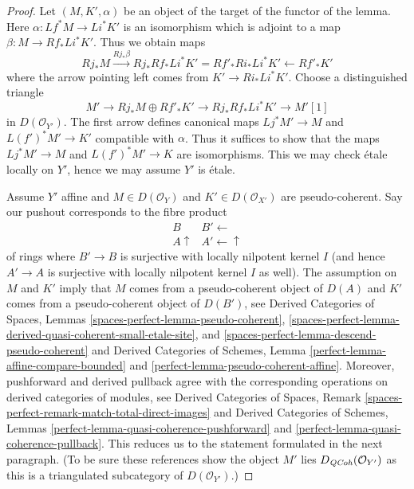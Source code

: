 \begin{proof}
Let $(M, K', \alpha)$ be an object of the target of the functor
of the lemma. Here $\alpha : Lf^*M \to Li^*K'$
is an isomorphism which is adjoint to a map $\beta : M \to Rf_*Li^*K'$.
Thus we obtain maps
$$
Rj_*M \xrightarrow{Rj_*\beta}
Rj_*Rf_*Li^*K' = Rf'_*Ri_*Li^*K' \leftarrow Rf'_*K'
$$
where the arrow pointing left comes from $K' \to Ri_*Li^*K'$.
Choose a distinguished triangle
$$
M' \to Rj_*M \oplus Rf'_*K' \to Rj_*Rf_*Li^*K' \to M'[1]
$$
in $D(\mathcal{O}_{Y'})$. The first arrow defines canonical maps
$Lj^*M' \to M$ and $L(f')^*M' \to K'$ compatible with $\alpha$.
Thus it suffices to show that the maps
$Lj^*M' \to M$ and $L(f')^*M' \to K$ are isomorphisms.
This we may check \'etale locally on $Y'$, hence we may
assume $Y'$ is \'etale.

\medskip\noindent
Assume $Y'$ affine and $M \in D(\mathcal{O}_Y)$
and $K' \in D(\mathcal{O}_{X'})$ are pseudo-coherent.
Say our pushout corresponds to the fibre product
$$
\begin{array}{cc}B & B' \longleftarrow \\ A \uparrow & A' \longleftarrow\uparrow\end{array}
$$
of rings where $B' \to B$ is surjective with locally nilpotent kernel $I$
(and hence $A' \to A$ is surjective with locally nilpotent kernel $I$ as well).
The assumption on $M$ and $K'$ imply that $M$ comes from a pseudo-coherent
object of $D(A)$ and $K'$ comes from a pseudo-coherent object of $D(B')$, see
Derived Categories of Spaces, Lemmas
\ref{spaces-perfect-lemma-pseudo-coherent},
\ref{spaces-perfect-lemma-derived-quasi-coherent-small-etale-site}, and
\ref{spaces-perfect-lemma-descend-pseudo-coherent}
and
Derived Categories of Schemes, Lemma
\ref{perfect-lemma-affine-compare-bounded} and
\ref{perfect-lemma-pseudo-coherent-affine}.
Moreover, pushforward and derived pullback agree with the
corresponding operations on derived categories of modules, see
Derived Categories of Spaces, Remark
\ref{spaces-perfect-remark-match-total-direct-images}
and
Derived Categories of Schemes, Lemmas
\ref{perfect-lemma-quasi-coherence-pushforward} and
\ref{perfect-lemma-quasi-coherence-pullback}.
This reduces us to the statement formulated in the next paragraph.
(To be sure these references show
the object $M'$ lies $D_{\mathit{QCoh}}(\mathcal{O}_{Y'})$
as this is a triangulated subcategory of $D(\mathcal{O}_{Y'})$.)


\end{proof}

